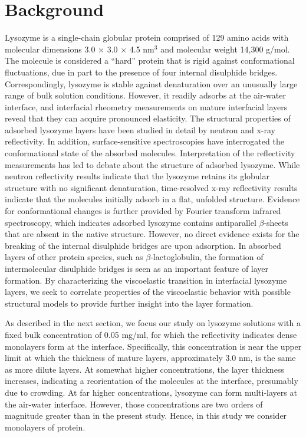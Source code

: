 \section{\label{sec:background}Background}

Lysozyme is a single-chain globular protein comprised of 129 amino acids with molecular dimensions 3.0 $\times$ 3.0 $\times$ 4.5 nm$^3$ and molecular weight 14,300 g/mol.  The molecule is considered a ``hard'' protein that is rigid against conformational fluctuations, due in part to the presence of four internal disulphide bridges.  Correspondingly, lysozyme is stable against denaturation over an unusually large range of bulk solution conditions.  However, it readily adsorbs at the air-water interface, and interfacial rheometry measurements on mature interfacial layers reveal that they can acquire pronounced elasticity.\cite{Roberts2005,Malcolm2006}   The structural properties of adsorbed lysozyme layers have been studied in detail by neutron and x-ray reflectivity.\cite{Lu1998,Lu1999,Yano2009}   In addition, surface-sensitive spectroscopies have interrogated the conformational state of the absorbed molecules.\cite{Postel2003a,Lad2006a}  Interpretation of the reflectivity measurements has led to debate about the structure of adsorbed lysozyme.  While neutron reflectivity results indicate that the lysozyme retains its globular structure with no significant denaturation, time-resolved x-ray reflectivity results indicate that the molecules initially adsorb in a flat, unfolded structure.  Evidence for conformational changes is further provided by Fourier transform infrared spectroscopy, which indicates adsorbed lysozyme contains antiparallel $\beta$-sheets that are absent in the native structure.\cite{Lad2006a}   However, no direct evidence exists for the breaking of the internal disulphide bridges are upon adsorption.  In absorbed layers of other protein species, such as  $\beta$-lactoglobulin, the formation of intermolecular disulphide bridges is seen as an important feature of layer formation.  By characterizing the viscoelastic transition in interfacial lysozyme layers, we seek to correlate properties of the viscoelastic behavior with possible structural models to provide further insight into the layer formation.

As described in the next section, we focus our study on lysozyme solutions with a fixed bulk concentration of 0.05 mg/ml, for which the reflectivity indicates dense monolayers form at the interface.\cite{Lu1998,Lu1999}  Specifically, this concentration is near the upper limit at which the thickness of mature layers, approximately 3.0 nm, is the same as more dilute layers.  At somewhat higher concentrations, the layer thickness increases, indicating a reorientation of the molecules at the interface, presumably due to crowding.  At far higher concentrations, lysozyme can form multi-layers at the air-water interface.  However, those concentrations are two orders of magnitude greater than in the present study.\cite{Lu1998}  Hence, in this study we consider monolayers of protein.


